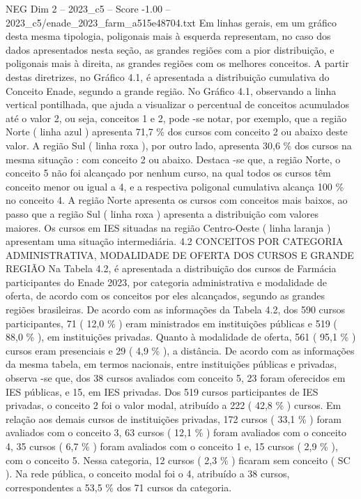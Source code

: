\begin{textsample}{NEG Dim 2 – 2023\_c5 – Score -1.00 – 2023\_c5/enade\_2023\_farm\_a515e48704.txt}
Em linhas gerais, em um gráfico desta mesma tipologia, poligonais mais à esquerda representam, no caso dos dados apresentados nesta seção, as grandes regiões com a pior distribuição, e poligonais mais à direita, as grandes regiões com os melhores conceitos.
A partir destas diretrizes, no Gráfico 4.1, é apresentada a distribuição cumulativa do Conceito Enade, segundo a grande região.
No Gráfico 4.1, observando a linha vertical pontilhada, que ajuda a visualizar o percentual de conceitos acumulados até o valor 2, ou seja, conceitos 1 e 2, pode -se notar, por exemplo, que a região Norte ( linha azul ) apresenta 71,7 \% dos cursos com conceito 2 ou abaixo deste valor.
A região Sul ( linha roxa ), por outro lado, apresenta 30,6 \% dos cursos na mesma situação : com conceito 2 ou abaixo.
Destaca -se que, a região Norte, o conceito 5 não foi alcançado por nenhum curso, na qual todos os cursos têm conceito menor ou igual a 4, e a respectiva poligonal cumulativa alcança 100 \% no conceito 4.
A região Norte apresenta os cursos com conceitos mais baixos, ao passo que a região Sul ( linha roxa ) apresenta a distribuição com valores maiores.
Os cursos em IES situadas na região Centro-Oeste ( linha laranja ) apresentam uma situação intermediária. 4.2 CONCEITOS POR CATEGORIA ADMINISTRATIVA, MODALIDADE DE OFERTA DOS CURSOS E GRANDE REGIÃO Na Tabela 4.2, é apresentada a distribuição dos cursos de Farmácia participantes do Enade 2023, por categoria administrativa e modalidade de oferta, de acordo com os conceitos por eles alcançados, segundo as grandes regiões brasileiras.
De acordo com as informações da Tabela 4.2, dos 590 cursos participantes, 71 ( 12,0 \% ) eram ministrados em instituições públicas e 519 ( 88,0 \% ), em instituições privadas.
Quanto à modalidade de oferta, 561 ( 95,1 \% ) cursos eram presenciais e 29 ( 4,9 \% ), a distância.
De acordo com as informações da mesma tabela, em termos nacionais, entre instituições públicas e privadas, observa -se que, dos 38 cursos avaliados com conceito 5, 23 foram oferecidos em IES públicas, e 15, em IES privadas.
Dos 519 cursos participantes de IES privadas, o conceito 2 foi o valor modal, atribuído a 222 ( 42,8 \% ) cursos.
Em relação aos demais cursos de instituições privadas, 172 cursos ( 33,1 \% ) foram avaliados com o conceito 3, 63 cursos ( 12,1 \% ) foram avaliados com o conceito 4, 35 cursos ( 6,7 \% ) foram avaliados com o conceito 1 e, 15 cursos ( 2,9 \% ), com o conceito 5.
Nessa categoria, 12 cursos ( 2,3 \% ) ficaram sem conceito ( SC ).
Na rede pública, o conceito modal foi o 4, atribuído a 38 cursos, correspondentes a 53,5 \% dos 71 cursos da categoria.

\end{textsample}
